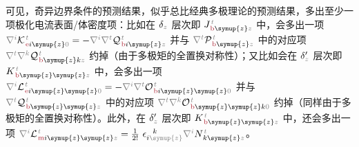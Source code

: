 可见，奇异边界条件的预测结果，似乎总比经典多极理论的预测结果，多出至少一项极化电流表面/体密度项：比如在 ${\delta}_{\mathcolor{gray}{z}}$ 层次即 ${J}^{\;\!\mathcolor{gray}{t}}_{\;\!\textcolor{Maroon}{\text{b}} \symup{z} \mathcolor{gray}{z}}$ 中，会多出一项 $\mathcolor{gray}{\nabla^i} {\mathcal{K}}^{\;\!\mathcolor{gray}{t}}_{\;\!\textcolor{Maroon}{\text{e}} i\symup{z}\mathcolor{gray}{0}} = - \mathcolor{gray}{\nabla^i} \mathcolor{gray}{\nabla^t} {\mathcal{Q}}^{\;\!\mathcolor{gray}{t}}_{\;\!\textcolor{Maroon}{\text{b}} i \symup{z} \mathcolor{gray}{z}}$ 并与 $\mathcolor{gray}{\nabla^t} {\mathcal{P}}^{\;\!\mathcolor{gray}{t}}_{\;\!\textcolor{Maroon}{\text{b}} \symup{z} \mathcolor{gray}{z}}$ 中的对应项 $\mathcolor{gray}{\nabla^t} \mathcolor{gray}{\nabla^k} {\mathcal{Q}}^{\;\!\mathcolor{gray}{t}}_{\;\!\textcolor{Maroon}{\text{b}} \symup{z}k \mathcolor{gray}{z}}$ 约掉（由于多极矩的全置换对称性\cite{raabMultipoleTheoryElectromagnetism2004}）；又比如会在 ${\delta}'_{\mathcolor{gray}{z}}$ 层次即 ${K}^{\;\!\mathcolor{gray}{t}}_{\;\!\textcolor{Maroon}{\text{b}} \symup{z} \symup{z} \mathcolor{gray}{z}}$ 中，会多出一项 $\mathcolor{gray}{\nabla^i} {\mathcal{L}}^{\;\!\mathcolor{gray}{t}}_{\;\!\textcolor{Maroon}{\text{e}} i\symup{z} \symup{z} \mathcolor{gray}{0}} = - \mathcolor{gray}{\nabla^i} \mathcolor{gray}{\nabla^t} {\mathcal{O}}^{\;\!\mathcolor{gray}{t}}_{\;\!\textcolor{Maroon}{\text{b}} i\symup{z} \symup{z} \mathcolor{gray}{0}}$ 并与 $\mathcolor{gray}{\nabla^t} {\mathcal{Q}}^{\;\!\mathcolor{gray}{t}}_{\;\!\textcolor{Maroon}{\text{b}} \symup{z} \symup{z} \mathcolor{gray}{z}}$ 中的对应项 $\mathcolor{gray}{\nabla^t} \mathcolor{gray}{\nabla^k} {\mathcal{O}}^{\;\!\mathcolor{gray}{t}}_{\;\!\textcolor{Maroon}{\text{b}} \symup{z} \symup{z}k \mathcolor{gray}{0}}$ 约掉（同样由于多极矩的全置换对称性）。此外，在 ${\delta}'_{\mathcolor{gray}{z}}$ 层次即 ${K}^{\;\!\mathcolor{gray}{t}}_{\;\!\textcolor{Maroon}{\text{b}} \symup{z} \symup{z} \mathcolor{gray}{z}}$ 中，还会多出一项 $\mathcolor{gray}{\nabla^i} {\mathcal{L}}^{\;\!\mathcolor{gray}{t}}_{\;\!\textcolor{Maroon}{\text{m}} i\symup{z} \symup{z} \mathcolor{gray}{z}} = \frac{1}{2!}~ \epsilon^{\hphantom{ij}k}_{i \mathcolor{gray}{\symup{z}}} \mathcolor{gray}{\nabla^i} N^{\;\!\mathcolor{gray}{t}}_{\;\! k\symup{z}\mathcolor{gray}{z}}$。

